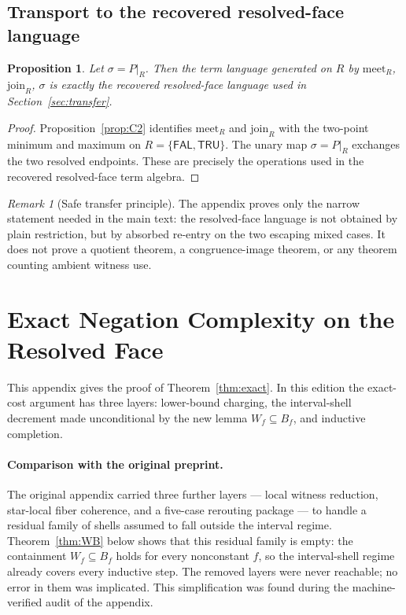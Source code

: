 \documentclass[11pt]{article}
\newtheorem{proposition}{Proposition}
\theoremstyle{remark}
\newtheorem*{remark}{Remark}
\newcommand{\FAL}{\ensuremath{\mathsf{FAL}}}
\newcommand{\TRU}{\ensuremath{\mathsf{TRU}}}
\newcommand{\meetR}{\ensuremath{\mathrm{meet}_R}}
\newcommand{\joinR}{\ensuremath{\mathrm{join}_R}}
\begin{document}
\subsection{Transport to the recovered resolved-face language}

\begin{proposition}
Let $\sigma=P|_R$. Then the term language generated on $R$ by $\meetR$,
$\joinR$, $\sigma$ is exactly the recovered resolved-face language used in
Section~\ref{sec:transfer}.
\end{proposition}

\begin{proof}
Proposition~\ref{prop:C2} identifies $\meetR$ and $\joinR$ with the
two-point minimum and maximum on $R=\{\FAL,\TRU\}$. The unary map
$\sigma=P|_R$ exchanges the two resolved endpoints. These are precisely the
operations used in the recovered resolved-face term algebra.
\end{proof}

\begin{remark}[Safe transfer principle]
The appendix proves only the narrow statement needed in the main text: the
resolved-face language is not obtained by plain restriction, but by
absorbed re-entry on the two escaping mixed cases. It does not prove a
quotient theorem, a congruence-image theorem, or any theorem counting
ambient witness use.
\end{remark}

\section{Exact Negation Complexity on the Resolved Face}\label{app:D}

This appendix gives the proof of Theorem~\ref{thm:exact}. In this edition
the exact-cost argument has three layers: lower-bound charging, the
interval-shell decrement made unconditional by the new lemma
$W_f\subseteq B_f$, and inductive completion.

\paragraph{Comparison with the original preprint.}
The original appendix carried three further layers --- local witness
reduction, star-local fiber coherence, and a five-case rerouting package
--- to handle a residual family of shells assumed to fall outside the
interval regime. Theorem~\ref{thm:WB} below shows that this residual family
is empty: the containment $W_f\subseteq B_f$ holds for every nonconstant
$f$, so the interval-shell regime already covers every inductive step. The
removed layers were never reachable; no error in them was implicated. This
simplification was found during the machine-verified audit of the appendix.
\end{document}
